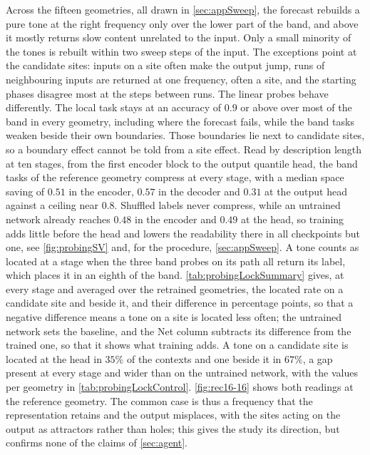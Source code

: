 Across the fifteen geometries, all drawn in \autoref{sec:appSweep}, the forecast rebuilds a pure tone at the right frequency only over the lower part of the band, and above it mostly returns slow content unrelated to the input. Only a small minority of the tones is rebuilt within two sweep steps of the input. The exceptions point at the candidate sites: inputs on a site often make the output jump, runs of neighbouring inputs are returned at one frequency, often a site, and the starting phases disagree most at the steps between runs. The linear probes behave differently. The local task stays at an accuracy of $0.9$ or above over most of the band in every geometry, including where the forecast fails, while the band tasks weaken beside their own boundaries. Those boundaries lie next to candidate sites, so a boundary effect cannot be told from a site effect\@. {\color{red}Read by description length at ten stages, from the first encoder block to the output quantile head, the band tasks of the reference geometry compress at every stage, with a median space saving of $0.51$ in the encoder, $0.57$ in the decoder and $0.31$ at the output head against a ceiling near $0.8$. Shuffled labels never compress, while an untrained network already reaches $0.48$ in the encoder and $0.49$ at the head, so training adds little before the head and lowers the readability there in all checkpoints but one, see \autoref{fig:probingSV} and, for the procedure, \autoref{sec:appSweep}. A tone counts as located at a stage when the three band probes on its path all return its label, which places it in an eighth of the band. \autoref{tab:probingLockSummary} gives, at every stage and averaged over the retrained geometries, the located rate on a candidate site and beside it, and their difference in percentage points, so that a negative difference means a tone on a site is located less often; the untrained network sets the baseline, and the Net column subtracts its difference from the trained one, so that it shows what training adds. A tone on a candidate site is located at the head in $35\%$ of the contexts and one beside it in $67\%$, a gap present at every stage and wider than on the untrained network, with the values per geometry in \autoref{tab:probingLockControl}.} %
\autoref{fig:rec16-16} shows both readings at the reference geometry. The common case is thus a frequency that the representation retains and the output misplaces, with the sites acting on the output as attractors rather than holes; this gives the study its direction, but confirms none of the claims of \autoref{sec:agent}.



